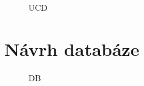 \documentclass[11pt, a4paper]{article}
\begin{document}
\begin{figure}[ht]
	\begin{center}
	\caption{UCD}
	\end{center}
\end{figure}

 \newpage

\section{Návrh databáze}

\begin{figure}[ht!]
	\begin{center}
	\caption{DB}
	\end{center}
\end{figure}
\end{document}
